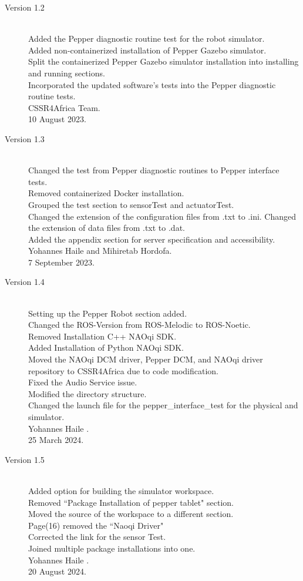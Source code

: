 \documentclass{CSSRforAfrica}
\begin{document}
{\begin{description}
\item [Version 1.2]~\\
Added the Pepper diagnostic routine test for the robot simulator.\\
Added non-containerized installation of Pepper Gazebo simulator.\\
Split the containerized Pepper Gazebo simulator installation into installing and running sections.\\
Incorporated the updated software's tests into the Pepper diagnostic routine tests.\\
CSSR4Africa Team.\\
10 August 2023.

\item [Version 1.3]~\\
Changed the test from Pepper diagnostic routines to Pepper interface tests.\\
Removed containerized Docker installation.\\
Grouped the test section to sensorTest and actuatorTest.\\
Changed the extension of the configuration files from .txt to .ini. Changed the extension of data files from .txt to .dat. \\
Added the appendix section for server specification and accessibility.\\
Yohannes Haile and Mihiretab Hordofa.\\
7 September 2023.

\item [Version 1.4]~\\
Setting up the Pepper Robot section added.\\
Changed the ROS-Version from ROS-Melodic to ROS-Noetic.\\
Removed Installation C++ NAOqi SDK.\\
Added Installation of Python NAOqi SDK.\\
Moved the NAOqi DCM driver, Pepper DCM, and NAOqi driver repository to CSSR4Africa due to code modification.\\
Fixed the Audio Service issue.\\
Modified the directory structure.\\
Changed the launch file for the pepper\_interface\_test for the physical and simulator.\\
Yohannes Haile .\\
25 March 2024.

\newpage

\item [Version 1.5]~\\
Added option for building the simulator workspace.\\
Removed ``Package Installation of pepper tablet" section.\\
Moved the source of the workspace to a different section.\\
Page(16) removed the ``Naoqi Driver" \\
Corrected the link for the sensor Test. \\
Joined multiple package installations into one.\\
Yohannes Haile .\\
20 August 2024.


\end{description}}
\end{document}
